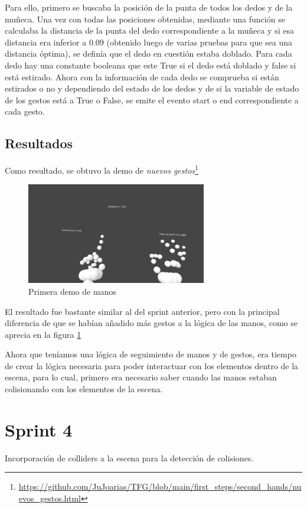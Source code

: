 \documentclass[a4paper, 12pt]{book}
\begin{document}
Para ello, primero se buscaba la posición de la punta de todos los dedos y de la muñeca. Una vez con todas las posiciones obtenidas, mediante una función se calculaba la distancia de la punta del dedo correspondiente a la muñeca y si esa distancia era inferior a 0.09 (obtenido luego de varias pruebas para que sea una distancia óptima), se definía que el dedo en cuestión estaba doblado.
Para cada dedo hay una constante booleana que este True si el dedo está doblado y false si está estirado. Ahora con la información de cada dedo se comprueba si están estirados o no y dependiendo del estado de los dedos y de si la variable de estado de los gestos está a True o False, se emite el evento start o end correspondiente a cada gesto. 

\subsection{Resultados}
\label{subsec:resultados3}
Como resultado, se obtuvo la demo de \textit{nuevos gestos}\footnote{\url{https://github.com/JuJoarias/TFG/blob/main/first_steps/second_hands/nuevos_gestos.html}}

\begin{figure}[H] 
  \centering
  \includegraphics[width=0.7\textwidth]{img/nuevos_gestos.jpg} 
  \caption{Primera demo de manos}
  \label{fig:sprint3}
\end{figure}

El resultado fue bastante similar al del sprint anterior, pero con la principal diferencia de que se habían añadido más gestos a la lógica de las manos, como se aprecia en la figura \ref{fig:sprint3}

Ahora que teníamos una lógica de seguimiento de manos y de gestos, era tiempo de crear la lógica necesaria para poder interactuar con los elementos dentro de la escena, para lo cual, primero era necesario saber cuando las manos estaban colisionando con los elementos de la escena. 
\section{Sprint 4}
\label{sec:sprint4}
Incorporación de colliders a la escena para la detección de colisiones.
\end{document}
